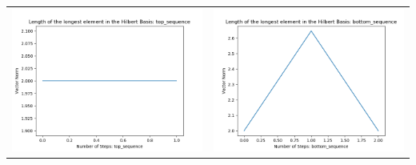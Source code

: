 \documentclass[10pt]{article}
\begin{document}
\begin{tabular}{c|c}
\begin{minipage}{.4\textwidth}
\includegraphics[width=\textwidth]{"DATA/5d/6 generators 1 bound F/top_sequence LENGTH"}
\end{minipage} &
\begin{minipage}{.4\textwidth}
\includegraphics[width=\textwidth]{"DATA/5d/6 generators 1 bound F bottomup/bottom_sequence LENGTH"}
\end{minipage}
\end{tabular}
\end{document}
